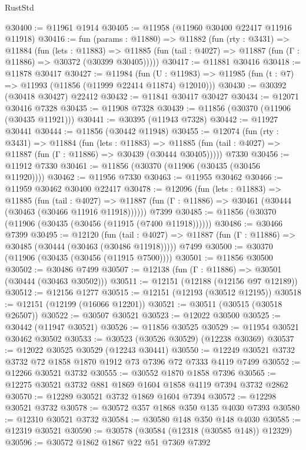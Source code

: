 \begin{lexlean}{RustStd}
\begin{coremodule}
@30400 := @11961 @1914
@30405 := @11958 (@11960 @30400 @22417 @11916 @11918)
@30416 := fun (params : @11880) =>
  @11882
    (fun (rty : @3431) =>
    @11884
      (fun (lets : @11883) =>
      @11885 (fun (tail : @4027) => @11887 (fun (Γ : @11886) => @30372 (@30399 @30405)))))
@30417 := @11881 @30416
@30418 := @11878 @30417
@30427 := @11984
    (fun (U : @11983) => @11985 (fun (t : @7) => @11993 (@11856 (@11999 @22414 @11874) @12010)))
@30430 := @30392 (@30418 @30427) @22412
@30432 := @11841 @30417 @30427
@30434 := @12071 @30416 @7328
@30435 := @11908 @7328
@30439 := @11856 (@30370 (@11906 (@30435 @11921)))
@30441 := @30395 (@11943 @7328)
@30442 := @11927 @30441
@30444 := @11856 (@30442 @11948)
@30455 := @12074
    (fun (rty : @3431) =>
    @11884
      (fun (lets : @11883) =>
      @11885 (fun (tail : @4027) => @11887 (fun (Γ : @11886) => @30439 (@30444 @30405)))))
    @7330
@30456 := @11912 @7330
@30461 := @11856 (@30370 (@11906 (@30435 (@30456 @11920))))
@30462 := @11956 @7330
@30463 := @11955 @30462
@30466 := @11959 @30462 @30400 @22417
@30478 := @12096
    (fun (lets : @11883) =>
    @11885
      (fun (tail : @4027) =>
      @11887 (fun (Γ : @11886) => @30461 (@30444 (@30463 (@30466 @11916 @11918))))))
    @7399
@30485 := @11856 (@30370 (@11906 (@30435 (@30456 (@11915 (@7400 @11918))))))
@30486 := @30466 @7399
@30495 := @12120
    (fun (tail : @4027) => @11887 (fun (Γ : @11886) => @30485 (@30444 (@30463 (@30486 @11918)))))
    @7499
@30500 := @30370 (@11906 (@30435 (@30456 (@11915 @7500))))
@30501 := @11856 @30500
@30502 := @30486 @7499
@30507 := @12138 (fun (Γ : @11886) => @30501 (@30444 (@30463 @30502)))
@30511 := @12151 (@12188 (@12156 @97 @12189))
@30512 := @12156 @1277
@30515 := @12151 (@12193 (@30512 @12195))
@30518 := @12151 (@12199 (@16066 @12201))
@30521 := @30511 (@30515 (@30518 @26507))
@30522 := @30507 @30521
@30523 := @12022 @30500
@30525 := @30442 (@11947 @30521)
@30526 := @11856 @30525
@30529 := @11954 @30521 @30462 @30502
@30533 := @30523 (@30526 @30529) (@12238 @30369)
@30537 := @12022 @30525 @30529 (@12243 @30441)
@30550 := @12249 @30521 @3732 @3732 @72 @1858 @1870 @1912 @73 @7396 @72 @7333 @4119 @7499
@30552 := @12266 @30521 @3732
@30555 := @30552 @1870 @1858 @7396
@30565 := @12275 @30521 @3732 @881 @1869 @1604 @1858 @4119 @7394 @3732 @2862
@30570 := @12289 @30521 @3732 @1869 @1604 @7394
@30572 := @12298 @30521 @3732
@30578 := @30572 @357 @1868 @350 @135 @4030 @7393
@30580 := @12310 @30521 @3732
@30584 := @30580 @148 @350 @148 @4030
@30585 := @12319 @30521
@30590 := @30578 (@30584 (@12318 (@30585 @148)) @12329)
@30596 := @30572 @1862 @1867 @22 @51 @7369 @7392

\end{coremodule}
\end{lexlean}
